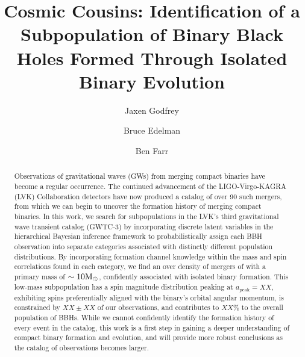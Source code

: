 \documentclass[twocolumn]{aastex631}
\newcommand{\msun}{\ensuremath{{\rm M}_\odot}}
\begin{document}
\title{Cosmic Cousins: Identification of a Subpopulation of Binary Black Holes Formed Through Isolated Binary Evolution}

\author{Jaxen Godfrey}
\author{Bruce Edelman}
\author{Ben Farr}

\begin{abstract}
    Observations of gravitational waves (GWs) from merging compact binaries have become a regular occurrence. The continued advancement of the LIGO-Virgo-KAGRA (LVK) Collaboration detectors have now produced a catalog of over 90 such mergers, from which we can begin to uncover the formation history of merging compact binaries. In this work, we search for subpopulations in the LVK's third gravitational wave transient catalog (GWTC-3) by incorporating discrete latent variables in the hierarchical Bayesian inference framework to probabilistically assign each BBH observation into separate categories associated with distinctly different population distributions. By incorporating formation channel knowledge within the mass and spin correlations found in each category, we find an over density of mergers of with a primary mass of $\sim10\msun$, confidently associated with isolated binary formation. This low-mass subpopulation has a spin magnitude distribution peaking at $a_\mathrm{peak}=XX$, exhibiting spins preferentially aligned with the binary's orbital angular momentum, is constrained by $XX \pm XX$ of our observations, and contributes to $XX\%$ to the overall population of BBHs. While we cannot confidently identify the formation history of every event in the catalog, this work is a first step in gaining a deeper understanding of compact binary formation and evolution, and will provide more robust conclusions as the catalog of observations becomes larger. 
\end{abstract}





\end{document}
